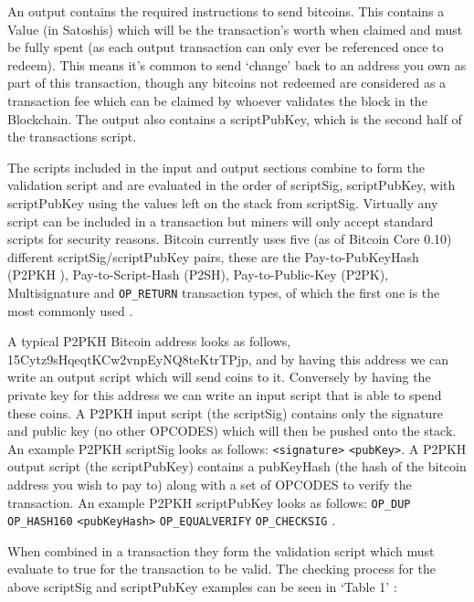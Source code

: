 \documentclass{article}
\begin{document}
An output contains the required instructions to send bitcoins. This contains a Value (in Satoshis) which will be the transaction’s worth when claimed and must be fully spent (as each output transaction can only ever be referenced once to redeem). This means it's common to send `change' back to an address you own as part of this transaction, though any bitcoins not redeemed are considered as a transaction fee which can be claimed by whoever validates the block in the Blockchain. The output also contains a scriptPubKey, which is the second half of the transactions script.

The scripts included in the input and output sections combine to form the validation script and are evaluated in the order of scriptSig, scriptPubKey, with scriptPubKey using the values left on the stack from scriptSig. Virtually any script can be included in a transaction but miners will only accept standard scripts for security reasons. Bitcoin currently uses five (as of Bitcoin Core 0.10) different scriptSig/scriptPubKey pairs, these are the Pay-to-PubKeyHash (P2PKH ), Pay-to-Script-Hash (P2SH), Pay-to-Public-Key (P2PK), Multisignature and \verb|OP_RETURN| transaction types, of which the first one is the most commonly used \citep{32_de_rosa_2015}\citep{33_kofler_2014}.

A typical P2PKH Bitcoin address looks as follows, 15Cytz9sHqeqtKCw2vnpEyNQ8teKtrTPjp, and by having this address we can write an output script which will send coins to it. Conversely by having the private key for this address we can write an input script that is able to spend these coins. A P2PKH input script (the scriptSig) contains only the signature and public key (no other OPCODES) which will then be pushed onto the stack. An example P2PKH scriptSig looks as follows: \verb|<signature>| \verb|<pubKey>|. A P2PKH output script (the scriptPubKey) contains a pubKeyHash (the hash of the bitcoin address you wish to pay to) along with a set of OPCODES to verify the transaction. An example P2PKH scriptPubKey looks as follows: \verb|OP_DUP| \verb|OP_HASH160| \verb|<pubKeyHash>| \verb|OP_EQUALVERIFY| \verb|OP_CHECKSIG| \citep{33_kofler_2014}\citep{30_transactions_-_bitcoin_wiki_2016}.

When combined in a transaction they form the validation script which must evaluate to true for the transaction to be valid. The checking process for the above scriptSig and scriptPubKey examples can be seen in `Table 1' \citep{32_de_rosa_2015}\citep{30_transactions_-_bitcoin_wiki_2016}:


    
\end{document}
